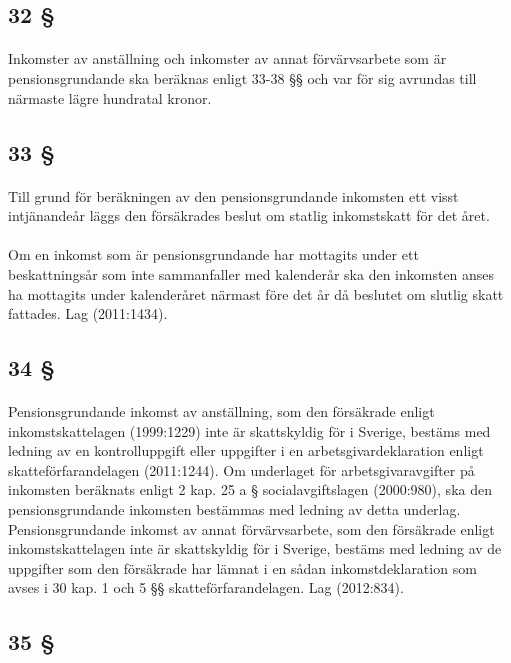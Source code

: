 \documentclass[a4paper,notitlepage,openany,10pt]{book}
\begin{document}
\subsection*{32 §}
\paragraph*{}
Inkomster av anställning och inkomster av annat förvärvsarbete som är pensionsgrundande ska beräknas enligt 33-38 §§ och var för sig avrundas till närmaste lägre hundratal kronor.
\subsection*{33 §}
\paragraph*{}
Till grund för beräkningen av den pensionsgrundande inkomsten ett visst intjänandeår läggs den försäkrades beslut om statlig inkomstskatt för det året.
\paragraph*{}
Om en inkomst som är pensionsgrundande har mottagits under ett beskattningsår som inte sammanfaller med kalenderår ska den inkomsten anses ha mottagits under kalenderåret närmast före det år då beslutet om slutlig skatt fattades.
Lag (2011:1434).
\subsection*{34 §}
\paragraph*{}
Pensionsgrundande inkomst av anställning, som den försäkrade enligt inkomstskattelagen (1999:1229) inte är skattskyldig för i Sverige, bestäms med ledning av en kontrolluppgift eller uppgifter i en arbetsgivardeklaration enligt skatteförfarandelagen (2011:1244). Om underlaget för arbetsgivaravgifter på inkomsten beräknats enligt 2 kap. 25 a § socialavgiftslagen (2000:980), ska den pensionsgrundande inkomsten bestämmas med ledning av detta underlag.
Pensionsgrundande inkomst av annat förvärvsarbete, som den försäkrade enligt inkomstskattelagen inte är skattskyldig för i Sverige, bestäms med ledning av de uppgifter som den försäkrade har lämnat i en sådan inkomstdeklaration som avses i 30 kap. 1 och 5 §§ skatteförfarandelagen.
Lag (2012:834).
\subsection*{35 §}
\end{document}
